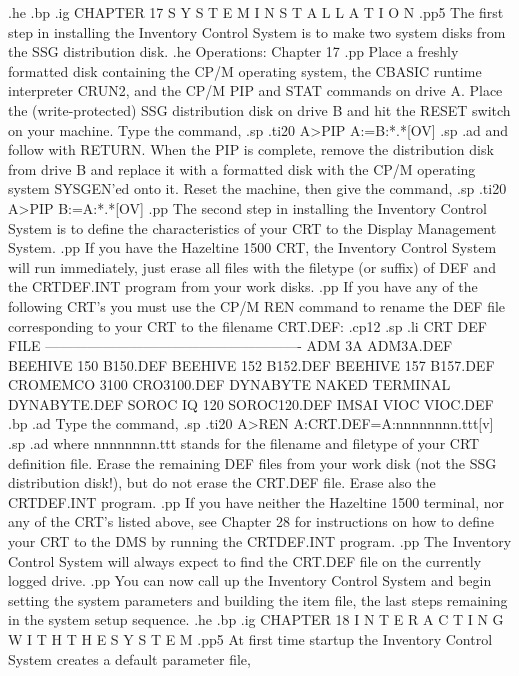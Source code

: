.he
.bp
.ig
CHAPTER 17
S Y S T E M    I N S T A L L A T I O N
.pp5
The first step in installing the Inventory Control System is to make
two system disks from the SSG distribution disk.
.he Operations: Chapter 17
.pp
Place a freshly formatted disk containing the CP/M operating system,
the CBASIC runtime interpreter CRUN2, and the CP/M PIP and STAT commands
on drive A.  Place the (write-protected)
SSG distribution disk on drive B and hit the
RESET switch on your machine.  Type the command,
.sp
.ti20
A>PIP A:=B:*.*[OV]
.sp
.ad
and follow with RETURN.  When the PIP is complete, remove the distribution
disk from drive B and replace it with a formatted disk with the
CP/M operating system SYSGEN'ed onto it.  Reset the machine, then
give the command,
.sp
.ti20
A>PIP B:=A:*.*[OV]
.pp
The second step in installing the Inventory Control System is to
define the characteristics of your CRT to the Display Management
System.
.pp
If you have the Hazeltine 1500 CRT, the Inventory Control
System will run immediately, just erase all files with the filetype
(or suffix) of DEF and the CRTDEF.INT program from your work disks.
.pp
If you have any of the following CRT's you must use the CP/M REN command
to rename the DEF file	corresponding to your CRT to the filename CRT.DEF:
.cp12
.sp
.li
      CRT			      DEF FILE
   -------------------------------------------------------
   ADM 3A			      ADM3A.DEF
   BEEHIVE 150			      B150.DEF
   BEEHIVE 152			      B152.DEF
   BEEHIVE 157			      B157.DEF
   CROMEMCO 3100		      CRO3100.DEF
   DYNABYTE NAKED TERMINAL	      DYNABYTE.DEF
   SOROC IQ 120 		      SOROC120.DEF
   IMSAI VIOC			      VIOC.DEF
.bp
.ad
Type the command,
.sp
.ti20
A>REN A:CRT.DEF=A:nnnnnnnn.ttt[v]
.sp
.ad
where nnnnnnnn.ttt stands for the filename and filetype of your CRT
definition file.  Erase the remaining DEF files from your work disk
(not the SSG distribution disk!), but do not erase the CRT.DEF file.
Erase also the CRTDEF.INT program.
.pp
If you have neither the Hazeltine 1500 terminal, nor any of the CRT's
listed above, see Chapter 28 for instructions on how to define your
CRT to the DMS by running the CRTDEF.INT program.
.pp
The Inventory Control System will always expect to find the CRT.DEF
file on the currently logged drive.
.pp
You can now call up the Inventory Control System and begin setting
the system parameters and building the item file, the last steps remaining
in the system setup sequence.
.he
.bp
.ig
CHAPTER 18
I N T E R A C T I N G	W I T H   T H E    S Y S T E M
.pp5
At first time startup
the Inventory Control System creates a default parameter file,
